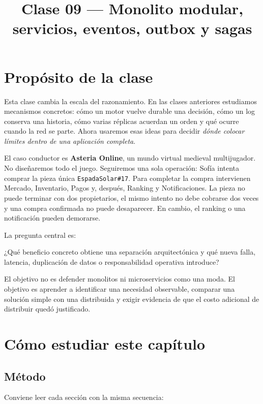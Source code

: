 \documentclass[variant=apuntes,cover=institutional,mode=screen]{ua-engineering-v6-article}
\title{Clase 09 --- Monolito modular, servicios, eventos, outbox y sagas}
\author{\UAProfessor}
\date{\UADate}
\begin{document}
\maketitle

\section{Propósito de la clase}

Esta clase cambia la escala del razonamiento. En las clases anteriores estudiamos mecanismos concretos: cómo un motor vuelve durable una decisión, cómo un log conserva una historia, cómo varias réplicas acuerdan un orden y qué ocurre cuando la red se parte. Ahora usaremos esas ideas para decidir \emph{dónde colocar límites dentro de una aplicación completa}.

El caso conductor es \textbf{Asteria Online}, un mundo virtual medieval multijugador. No diseñaremos todo el juego. Seguiremos una sola operación: Sofía intenta comprar la pieza única \texttt{EspadaSolar\#17}. Para completar la compra intervienen Mercado, Inventario, Pagos y, después, Ranking y Notificaciones. La pieza no puede terminar con dos propietarios, el mismo intento no debe cobrarse dos veces y una compra confirmada no puede desaparecer. En cambio, el ranking o una notificación pueden demorarse.

La pregunta central es:

\begin{uakeybox}
¿Qué beneficio concreto obtiene una separación arquitectónica y qué nueva falla, latencia, duplicación de datos o responsabilidad operativa introduce?
\end{uakeybox}

El objetivo no es defender monolitos ni microservicios como una moda. El objetivo es aprender a identificar una necesidad observable, comparar una solución simple con una distribuida y exigir evidencia de que el costo adicional de distribuir quedó justificado.

\section{Cómo estudiar este capítulo}
\subsection{Método}

Conviene leer cada sección con la misma secuencia:
\end{document}
